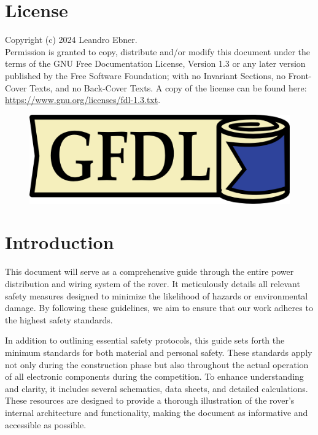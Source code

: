 \section{License}

    Copyright (c)  2024 Leandro Ebner. \\
    Permission is granted to copy, distribute and/or modify this document under the terms of the GNU Free Documentation License, Version 1.3 or any later version published by the Free Software Foundation; with no Invariant Sections, no Front-Cover Texts, and no Back-Cover Texts. A copy of the license can be found here:
    \href{https://www.gnu.org/licenses/fdl-1.3.txt}{https://www.gnu.org/licenses/fdl-1.3.txt}.

    \begin{figure}[h!]
    \includegraphics{contents/figures/gfdl-logo.png}
    \end{figure}                        
\section{Introduction}

    This document will serve as a comprehensive guide through the entire power distribution and wiring system of the rover. It meticulously details all relevant safety measures designed to minimize the likelihood of hazards or environmental damage. By following these guidelines, we aim to ensure that our work adheres to the highest safety standards. 

    \vspace{5mm}

    In addition to outlining essential safety protocols, this guide sets forth the minimum standards for both material and personal safety. These standards apply not only during the construction phase but also throughout the actual operation of all electronic components during the competition. To enhance understanding and clarity, it includes several schematics, data sheets, and detailed calculations. These resources are designed to provide a thorough illustration of the rover's internal architecture and functionality, making the document as informative and accessible as possible.

